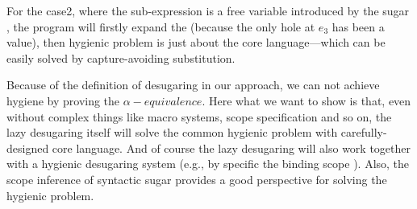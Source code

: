 For the case2, where the sub-expression  is a free variable introduced by the sugar , the program will firstly expand the  (because the only hole at $e_3$ has been a value), then hygienic problem is just about the core language---which can be easily solved by capture-avoiding substitution.


Because of the definition of desugaring in our approach, we can not achieve hygiene by proving the $\alpha-equivalence$.
Here what we want to show is that, even without complex things like macro systems, scope specification and so on, the lazy desugaring itself will solve the common hygienic problem with carefully-designed core language. And of course the lazy desugaring will also work together with a hygienic desugaring system (e.g., by specific the binding scope \cite{10.5555/1792878.1792884}). Also, the scope inference of syntactic sugar\cite{resugaringscope} provides a good perspective for solving the hygienic problem.
